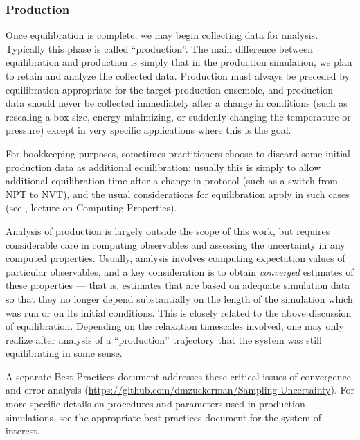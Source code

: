 \documentclass[9pt,bestpractices]{livecoms}
\begin{document}
\subsubsection{Production}

Once equilibration is complete, we may begin collecting data for analysis.
Typically this phase is called ``production''.
The main difference between equilibration and production is simply that in the production simulation, we plan to retain and analyze the collected data.
Production must always be preceded by equilibration appropriate for the target production ensemble, and production data should never be collected immediately after a change in conditions (such as rescaling a box size, energy minimizing, or suddenly changing the temperature or pressure) except in very specific applications where this is the goal.

For bookkeeping purposes, sometimes practitioners choose to discard some initial production data as additional equilibration; usually this is simply to allow additional equilibration time after a change in protocol (such as a switch from NPT to NVT), and the usual considerations for equilibration apply in such cases (see \citet{ShellNotes}, lecture on Computing Properties).

Analysis of production is largely outside the scope of this work, but requires considerable care in computing observables and assessing the uncertainty in any computed properties.
Usually, analysis involves computing expectation values of particular observables, and a key consideration is to obtain \emph{converged} estimates of these properties --- that is, estimates that are based on adequate simulation data so that they no longer depend substantially on the length of the simulation which was run or on its initial conditions.
This is closely related to the above discussion of equilibration.
Depending on the relaxation timescales involved, one may only realize after analysis of a ``production'' trajectory that the system was still equilibrating in some sense.

A separate Best Practices document addresses these critical issues of convergence and error analysis (\url{https://github.com/dmzuckerman/Sampling-Uncertainty}). 
For more specific details on procedures and parameters used in production simulations, see the appropriate best practices document for the system of interest.
\end{document}
